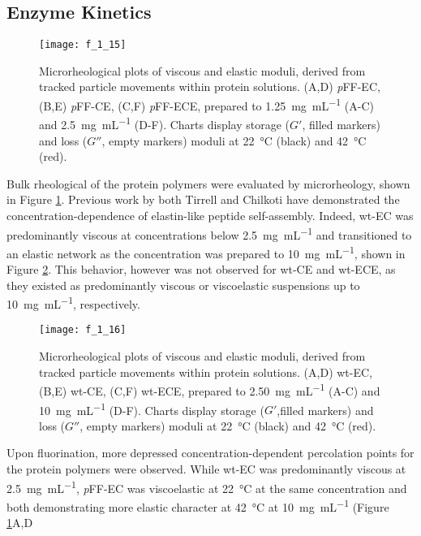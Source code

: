 \begin{refsection}
\subsection{Enzyme Kinetics}
\begin{figure}[h!] \centering \texttt{[image: f\_1\_15]}
    \caption{Microrheological plots of viscous and elastic moduli, derived from
    tracked particle movements within protein solutions. (A,D) \emph{p}FF-EC, (B,E)
    \emph{p}FF-CE, (C,F) \emph{p}FF-ECE, prepared to \SI{1.25}{\mg\per\mL} (A-C) and
    \SI{2.5}{\mg\per\mL} (D-F). Charts display storage (${G'}$, filled markers) and loss
    (${G''}$, empty markers) moduli at \SI{22}{\celsius} (black) and \SI{42}{\celsius}
(red).} \label{fig:pFF_rheology} \end{figure}
Bulk rheological of the protein polymers were evaluated by microrheology, shown
in Figure \ref{fig:pFF_rheology}. Previous work by both Tirrell and Chilkoti
have demonstrated the concentration-dependence of elastin-like peptide
self-assembly.\cite{Meyer2004,Yamaoka2003} Indeed, wt-EC was predominantly
viscous at concentrations below \SI{2.5}{\mg\per\mL} and transitioned to an
elastic network as the concentration was prepared to \SI{10}{\mg\per\mL}, shown
in Figure \ref{fig:wt_rheology}.\cite{Haghpanah2010} This behavior, however was
not observed for wt-CE and wt-ECE, as they existed as predominantly viscous or
viscoelastic suspensions up to \SI{10}{\mg\per\mL}, respectively.
\begin{figure}[h!] \centering \texttt{[image: f\_1\_16]}
    \caption{Microrheological plots of viscous and elastic moduli, derived from
    tracked particle movements within protein solutions. (A,D) wt-EC, (B,E)
    wt-CE, (C,F) wt-ECE, prepared to \SI{2.50}{\mg\per\mL} (A-C) and
    \SI{10}{\mg\per\mL} (D-F). Charts display storage (${G'}$,filled markers) and loss
    (${G''}$, empty markers) moduli at \SI{22}{\celsius} (black) and \SI{42}{\celsius}
(red).} \label{fig:wt_rheology} \end{figure}
Upon fluorination, more depressed concentration-dependent percolation points for
the protein polymers were observed. While wt-EC was predominantly viscous at
\SI{2.5}{\mg\per\mL}, \emph{p}FF-EC was viscoelastic at \SI{22}{\celsius} at the
same concentration and both demonstrating more elastic character at
\SI{42}{\celsius} at \SI{10}{\mg\per\mL} (Figure \ref{fig:pFF_rheology}A,D

\end{refsection}
